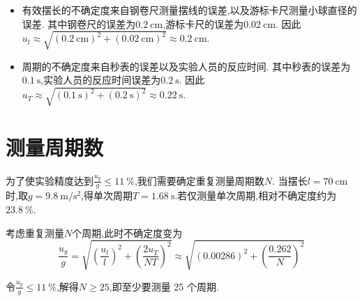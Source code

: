 \documentclass[9pt,a4paper,twoside]{../rho-class/rho}
\begin{document}
\begin{rhoenv}[frametitle=注意.]
    \begin{itemize}
        \item 有效摆长的不确定度来自钢卷尺测量摆线的误差,以及游标卡尺测量小球直径的误差.
              其中钢卷尺的误差为$\qty{0.2}{\centi\metre}$,游标卡尺的误差为$\qty{0.02}{\centi\metre}$.
              因此$u_l \approx \sqrt{(\qty{0.2}{\centi\metre})^2 + (\qty{0.02}{\centi\metre})^2} \approx \qty{0.2}{\centi\metre}$.

        \item 周期的不确定度来自秒表的误差以及实验人员的反应时间.
              其中秒表的误差为$\qty{0.1}{\second}$,实验人员的反应时间误差为$\qty{0.2}{\second}$.
              因此$u_T \approx \sqrt{(\qty{0.1}{\second})^2 + (\qty{0.2}{\second})^2} \approx \qty{0.22}{\second}$.
    \end{itemize}
\end{rhoenv}

\section{测量周期数}

为了使实验精度达到$\frac{u_g}{g} \leqslant 1 \qty{1}{\percent}$,我们需要确定重复测量周期数$N$.
当摆长$l = \qty{70}{\centi\metre}$时,取$g = \qty{9.8}{\metre\per\second\squared}$,得单次周期$T = \qty{1.68}{\second}$.若仅测量单次周期,相对不确定度约为$\qty{23.8}{\percent}$.

考虑重复测量$N$个周期,此时不确定度变为
\begin{equation}
    \frac{u_g}{g} = \sqrt{\left( \frac{u_l}{l} \right)^2 + \left( \frac{2u_T}{NT} \right)^2} \approx \sqrt{\left( 0.00286 \right)^2 + \left( \frac{0.262}{N} \right)^2}
\end{equation}

令$\frac{u_g}{g} \leqslant 1 \qty{1}{\percent}$,解得$N \geqslant 25$,即至少要测量 25 个周期.
\end{document}
